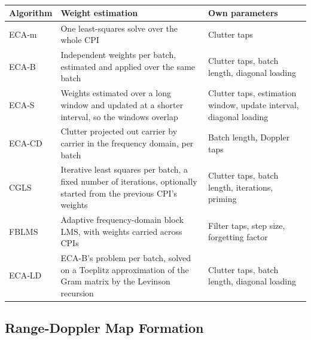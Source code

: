 \begin{table}[H]
    \centering
    \caption[TODO]{}
    \label{tab:ch3.dsi}
    \begin{tabularx}{\textwidth}{>{\raggedright\arraybackslash}p{1.9cm}>{\raggedright\arraybackslash}X>{\raggedright\arraybackslash}p{5.2cm}}
    \toprule
    \textbf{Algorithm} & \textbf{Weight estimation} & \textbf{Own parameters} \\
    \midrule
    ECA-m  & One least-squares solve over the whole CPI & Clutter taps \\
    ECA-B  & Independent weights per batch, estimated and applied over the same batch & Clutter taps, batch length, diagonal loading \\
    ECA-S  & Weights estimated over a long window and updated at a shorter interval, so the windows overlap & Clutter taps, estimation window, update interval, diagonal loading \\
    ECA-CD & Clutter projected out carrier by carrier in the frequency domain, per batch & Batch length, Doppler taps \\
    CGLS   & Iterative least squares per batch, a fixed number of iterations, optionally started from the previous CPI's weights & Clutter taps, batch length, iterations, priming \\
    FBLMS  & Adaptive frequency-domain block LMS, with weights carried across CPIs & Filter taps, step size, forgetting factor \\
    ECA-LD & ECA-B's problem per batch, solved on a Toeplitz approximation of the Gram matrix by the Levinson recursion & Clutter taps, batch length, diagonal loading \\
    \bottomrule
    \end{tabularx}
\end{table}

\subsection{Range-Doppler Map Formation}
\label{subsec:ch3.stages.ard}

